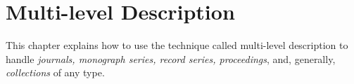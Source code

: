 
\chapter{Multi-level Description}
\label{cha:rghier}

This chapter explains how to use the technique called multi-level
description to handle \textit{journals, monograph series, record
  series, proceedings}, and, generally, \textit{collections} of any
type. 






  
